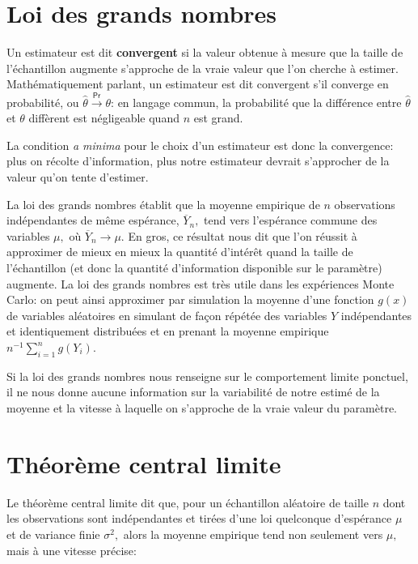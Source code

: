 \documentclass[
  11pt,
  letterpaper,
]{scrbook}
\theoremstyle{plain}
\theoremstyle{plain}
\theoremstyle{definition}
\theoremstyle{definition}
\theoremstyle{remark}
\begin{document}
\section{Loi des grands nombres}\label{loi-grands-nombres}

Un estimateur est dit \textbf{convergent} si la valeur obtenue à mesure
que la taille de l'échantillon augmente s'approche de la vraie valeur
que l'on cherche à estimer. Mathématiquement parlant, un estimateur est
dit convergent s'il converge en probabilité, ou
\(\hat{\theta} \stackrel{\mathsf{Pr}}{\to} \theta\): en langage commun,
la probabilité que la différence entre \(\hat{\theta}\) et \(\theta\)
diffèrent est négligeable quand \(n\) est grand.

La condition \emph{a minima} pour le choix d'un estimateur est donc la
convergence: plus on récolte d'information, plus notre estimateur
devrait s'approcher de la valeur qu'on tente d'estimer.

La loi des grands nombres établit que la moyenne empirique de \(n\)
observations indépendantes de même espérance, \(\overline{Y}_n,\) tend
vers l'espérance commune des variables \(\mu,\) où
\(\overline{Y}_n \rightarrow \mu.\) En gros, ce résultat nous dit que
l'on réussit à approximer de mieux en mieux la quantité d'intérêt quand
la taille de l'échantillon (et donc la quantité d'information disponible
sur le paramètre) augmente. La loi des grands nombres est très utile
dans les expériences Monte Carlo: on peut ainsi approximer par
simulation la moyenne d'une fonction \(g(x)\) de variables aléatoires en
simulant de façon répétée des variables \(Y\) indépendantes et
identiquement distribuées et en prenant la moyenne empirique
\(n^{-1} \sum_{i=1}^n g(Y_i).\)

Si la loi des grands nombres nous renseigne sur le comportement limite
ponctuel, il ne nous donne aucune information sur la variabilité de
notre estimé de la moyenne et la vitesse à laquelle on s'approche de la
vraie valeur du paramètre.

\section{Théorème central limite}\label{TCL}

Le théorème central limite dit que, pour un échantillon aléatoire de
taille \(n\) dont les observations sont indépendantes et tirées d'une
loi quelconque d'espérance \(\mu\) et de variance finie \(\sigma^2,\)
alors la moyenne empirique tend non seulement vers \(\mu,\) mais à une
vitesse précise:
\end{document}
